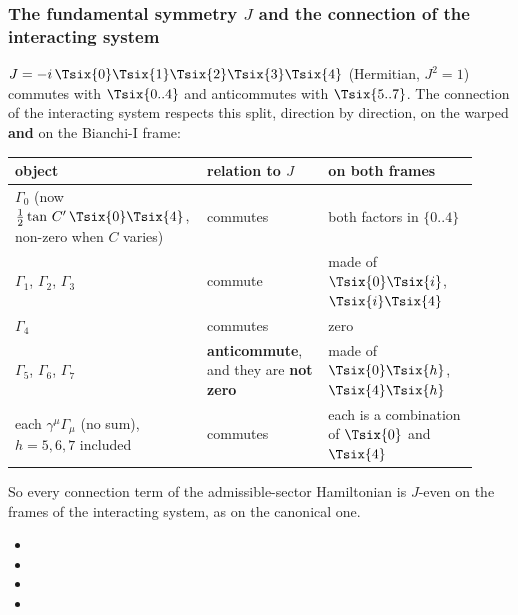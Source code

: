 \subsubsection{The fundamental symmetry \texorpdfstring{$J$}{J} and the connection of the interacting system}
\label{sec:4.4.7}

$J=-i\,\Tsix{0}\Tsix{1}\Tsix{2}\Tsix{3}\Tsix{4}$ (Hermitian, $J^2=1$) commutes with $\Tsix{0..4}$ and
anticommutes with $\Tsix{5..7}$. The connection of the interacting system respects this split, direction
by direction, on the warped \textbf{and} on the Bianchi-I frame:
\begin{center}
\small
\renewcommand{\arraystretch}{1.3}
\begin{tabular}{@{}>{\raggedright\arraybackslash}p{0.36\linewidth}>{\raggedright\arraybackslash}p{0.25\linewidth}>{\raggedright\arraybackslash}p{0.31\linewidth}@{}}
\toprule
object & relation to $J$ & on both frames\\
\midrule
$\Gamma_0$ (now $\tfrac12\tan\,C'\,\Tsix{0}\Tsix{4}$, non-zero when $C$ varies) & commutes & both factors in $\{0..4\}$\\
$\Gamma_1$, $\Gamma_2$, $\Gamma_3$ & commute & made of $\Tsix{0}\Tsix{i}$, $\Tsix{i}\Tsix{4}$\\
$\Gamma_4$ & commutes & zero\\
$\Gamma_5$, $\Gamma_6$, $\Gamma_7$ & \textbf{anticommute}, and they are \textbf{not zero} & made of $\Tsix{0}\Tsix{h}$, $\Tsix{4}\Tsix{h}$\\
each $\gamma^\mu\Gamma_\mu$ (no sum), $h=5,6,7$ included & commutes & each is a combination of $\Tsix{0}$ and $\Tsix{4}$\\
\bottomrule
\end{tabular}
\end{center}
So every connection term of the admissible-sector Hamiltonian is $J$-even on the frames of the
interacting system, as on the canonical one. 
\begin{itemize}
  \item {}
  \item {}
  \item {}
  \item {}
\end{itemize}

